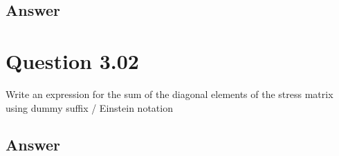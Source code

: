 \documentclass[
	12pt, %
]{fphw}
\begin{document}

\subsection*{Answer}




\section*{Question 3.02}

\begin{problem}
Write an expression for the sum of the diagonal elements of the stress matrix using dummy suffix / Einstein notation
\end{problem}


\subsection*{Answer}



\end{document}
